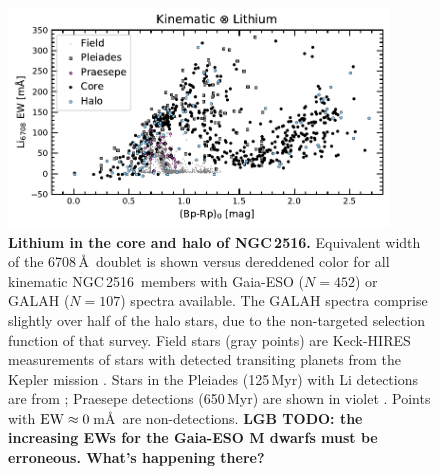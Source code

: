 \documentclass[12pt,twocolumn,tighten]{aastex63}
\newcommand{\cn}{NGC\,2516} %
\begin{document}
\begin{figure}[t]
	\begin{center}
		\leavevmode
			\includegraphics[width=0.9\textwidth]{f5a.pdf}
	\end{center}
	\vspace{-0.7cm}
  \caption{ {\bf Lithium in the core and halo of NGC\,2516.}
  Equivalent width of the 6708\,\AA\ doublet is shown versus
  dereddened color for all kinematic \cn\ members with Gaia-ESO
  ($N=452$) or GALAH ($N=107$) spectra available.  The GALAH spectra
  comprise slightly over half of the halo stars, due to the
  non-targeted selection function of that survey.  Field stars (gray
  points) are Keck-HIRES measurements of stars with detected
  transiting planets from the Kepler mission
  \citep{berger_identifying_2018}.  Stars in the Pleiades (125\,Myr)
  with Li detections are from \citet{bouvier_pleiades_lirot_2018};
  Praesepe detections (650\,Myr) are shown in violet
  \citep{soderblom_praesepe_1993}.  Points with ${\rm
  EW}\approx0\,$m\AA\ are non-detections.
  {\bf LGB TODO: the increasing EWs for the Gaia-ESO M dwarfs must be erroneous. What's happening there?}
  \label{fig:lithiumcorehalo}
  }
\end{figure}
\end{document}
